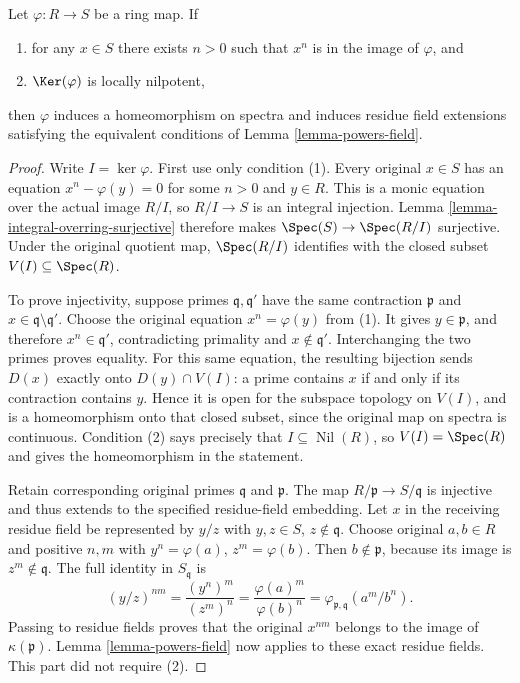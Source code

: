 \begin{lemma}
\label{lemma-powers}
Let $\varphi : R \to S$ be a ring map. If
\begin{enumerate}
\item for any $x \in S$ there exists $n > 0$ such that
$x^n$ is in the image of $\varphi$, and
\item $\Ker(\varphi)$ is locally nilpotent,
\end{enumerate}
then $\varphi$ induces a homeomorphism on spectra and induces residue
field extensions satisfying the equivalent conditions of
Lemma \ref{lemma-powers-field}.
\end{lemma}

\begin{proof}
Write $I=\ker\varphi$. First use only
condition (1). Every original $x\in S$
has an equation $x^n-\varphi(y)=0$
for some $n>0$ and $y\in R$. This is
a monic equation over the actual image
$R/I$, so $R/I\to S$ is an integral
injection. Lemma
\ref{lemma-integral-overring-surjective}
therefore makes $\Spec(S)\to\Spec(R/I)$
surjective. Under the original quotient
map, $\Spec(R/I)$ identifies with
the closed subset $V(I)\subseteq\Spec(R)$.

To prove injectivity, suppose primes
$\mathfrak q,\mathfrak q'$ have the
same contraction $\mathfrak p$ and
$x\in\mathfrak q\setminus\mathfrak q'$.
Choose the original equation
$x^n=\varphi(y)$ from (1). It gives
$y\in\mathfrak p$, and therefore
$x^n\in\mathfrak q'$, contradicting
primality and $x\notin\mathfrak q'$.
Interchanging the two primes proves
equality. For this same equation,
the resulting bijection sends $D(x)$
exactly onto $D(y)\cap V(I)$: a prime
contains $x$ if and only if its
contraction contains $y$. Hence it
is open for the subspace topology
on $V(I)$, and is a homeomorphism
onto that closed subset, since the
original map on spectra is continuous.
Condition (2) says precisely that
$I\subseteq\operatorname{Nil}(R)$,
so $V(I)=\Spec(R)$ and gives the
homeomorphism in the statement.

Retain corresponding original primes
$\mathfrak q$ and $\mathfrak p$.
The map $R/\mathfrak p\to S/\mathfrak q$
is injective and thus extends to the
specified residue-field embedding.
Let $x$ in the receiving residue
field be represented by $y/z$ with
$y,z\in S$, $z\notin\mathfrak q$.
Choose original $a,b\in R$ and
positive $n,m$ with
$y^n=\varphi(a)$, $z^m=\varphi(b)$.
Then $b\notin\mathfrak p$, because
its image is $z^m\notin\mathfrak q$.
The full identity in $S_{\mathfrak q}$ is
$$
(y/z)^{nm}
=\frac{(y^n)^m}{(z^m)^n}
=\frac{\varphi(a)^m}{\varphi(b)^n}
=\varphi_{\mathfrak p,\mathfrak q}(a^m/b^n).
$$
Passing to residue fields proves
that the original $x^{nm}$ belongs
to the image of $\kappa(\mathfrak p)$.
Lemma \ref{lemma-powers-field} now
applies to these exact residue fields.
This part did not require (2).


\end{proof}
